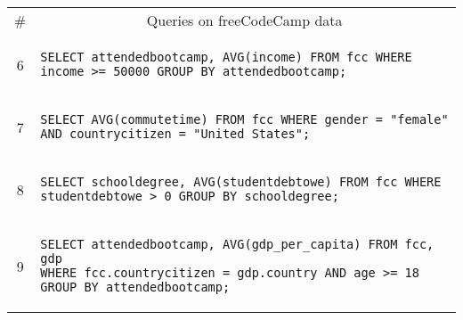 {\begin{tabular}{cl}
\begin{minipage}{6in}
      \end{minipage}{queryno}\label[query]{q5}\\
  \midrule
  \# & \multicolumn{1}{c}{Queries on freeCodeCamp data} \\
  \midrule
  6 & 
      \begin{minipage}{6in}
\begin{lstlisting}[breaklines]
SELECT attendedbootcamp, AVG(income) FROM fcc WHERE income >= 50000 GROUP BY attendedbootcamp;
\end{lstlisting}
      \end{minipage}{queryno} \label[query]{q6} \\[-1.5ex]
  7 & 
      \begin{minipage}{6in}
\begin{lstlisting}[breaklines]
SELECT AVG(commutetime) FROM fcc WHERE gender = "female" AND countrycitizen = "United States";
\end{lstlisting}
      \end{minipage}{queryno} \label[query]{q7} \\[-1.5ex]
  8 & 
      \begin{minipage}{6in}
\begin{lstlisting}[breaklines]
SELECT schooldegree, AVG(studentdebtowe) FROM fcc WHERE studentdebtowe > 0 GROUP BY schooldegree;
\end{lstlisting}
      \end{minipage}{queryno} \label[query]{q8}\\[-1.5ex]
  9 & 
      \begin{minipage}{6in}
\begin{lstlisting}[breaklines]
SELECT attendedbootcamp, AVG(gdp_per_capita) FROM fcc, gdp 
WHERE fcc.countrycitizen = gdp.country AND age >= 18 GROUP BY attendedbootcamp;
\end{lstlisting}
      \end{minipage}{queryno} \label[query]{q9}\\[-1.5ex]
  \bottomrule
\end{tabular}
}
